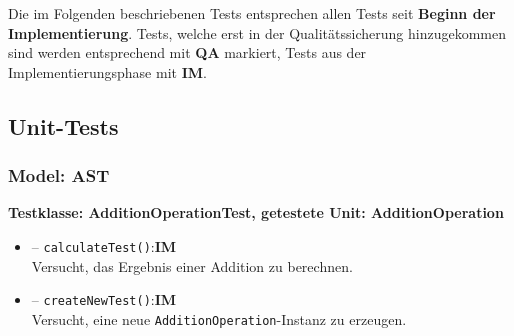 \documentclass[parskip=full,11pt,twoside]{scrartcl}
\def\qa{\hfill\textbf{QA}}
\def\impl{\hfill\textbf{IM}}
\begin{document}
Die im Folgenden beschriebenen Tests entsprechen allen Tests seit \textbf{Beginn der Implementierung}. Tests, welche erst in der Qualitätssicherung hinzugekommen sind werden entsprechend mit \textbf{QA} markiert, Tests aus der Implementierungsphase mit \textbf{IM}.

\subsection{Unit-Tests}

\newenvironment{testClass}[1]{
    \newcommand{\test}[3]{
        \item[--] \texttt{##1}:##2\\##3
    }

    \newcommand{\equalsTest}[2]{
        \test{equalsTest()}{##1}{
            Versucht, die Gleichheit bzw. Ungleichheit verschiedener ##2 festzustellen.
            Insbesondere wird die Ungleichheit zu \texttt{null} ohne das Werfen einer \texttt{Null\-Pointer\-Exception} getestet.
        }
    }

    \newcommand{\hashCodeTest}{
        \test{hashCodeTest()}{\qa}{
            Versucht, den hash code der Instanz abzurufen und stellt sicher, dass dieser unter Einsatz des Algorithmus der Methode \texttt{java.util.Objects.hash} berechnet wurde.
        }
    }

    \newcommand{\createActivationRecordTest}[3]{
        \test{createActivationRecordTest()}{##1}{
            Versucht, über die Instanziierung eines \texttt{Interpreters} mit dem Ziel \texttt{##2} einen \texttt{##3} zu erzeugen.
        }
    }

    \newcommand{\toStringTest}[2]{
        \test{toStringTest()}{##1}{
            Versucht, die String-Darstellung \texttt{##2} abzurufen.
        }
    }

    \textbf{Testklasse: #1Test, getestete Unit: #1}

    \begin{itemize}
}{
    \end{itemize}
}

\subsubsection{Model: AST}

\begin{testClass}{AdditionOperation}
    \test{calculateTest()}{\impl}{
        Versucht, das Ergebnis einer Addition zu berechnen.
    }
    \test{createNewTest()}{\impl}{
        Versucht, eine neue \texttt{AdditionOperation}-Instanz zu erzeugen.
    }
\end{testClass}
\end{document}
